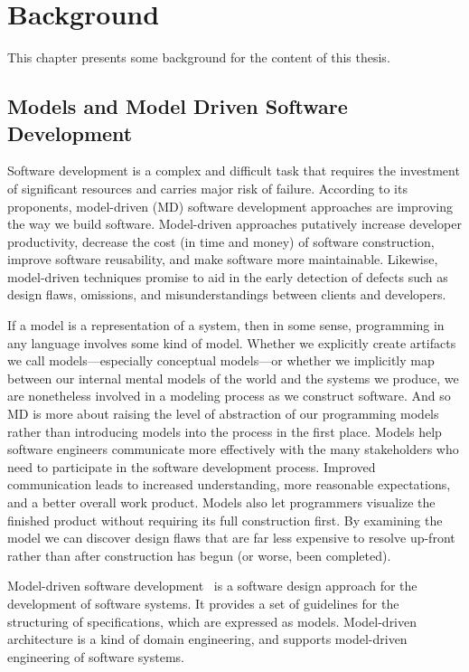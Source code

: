 
\chapter{Background} %

\label{chapter2_bg}
This chapter presents some background for the content of this thesis.

\section{Models and Model Driven Software Development}
\label{mdsd}
Software development is a complex and difficult task that requires the investment of significant resources and carries major risk of failure. According to its proponents, model-driven (MD) software development approaches are improving the way we build software. Model-driven approaches putatively increase developer productivity, decrease the cost (in time and money) of software construction, improve software reusability, and make software more maintainable. Likewise, model-driven techniques promise to aid in the early detection of defects such as design flaws, omissions, and misunderstandings between clients and developers. \par
	If a model is a representation of a system, then in some sense, programming in any language involves some kind of model. Whether we explicitly create artifacts we call models—especially conceptual models—or whether we implicitly map between our internal mental models of the world and the systems we produce, we are nonetheless involved in a modeling process as we construct software. And so MD is more about raising the level of abstraction of our programming models rather than introducing models into the process in the first place. Models  help software engineers communicate more effectively with the many stakeholders who need to participate in the software development process. Improved communication leads to increased understanding, more reasonable expectations, and a better overall work product. Models also let programmers visualize the finished product without requiring its full construction first. By examining the model we can discover design flaws that are far less expensive to resolve up-front rather than after construction has begun (or worse, been completed).\par
	Model-driven software development~\cite{liddle2011model} is a software design approach for the development of software systems. It provides a set of guidelines for the structuring of specifications, which are expressed as models. Model-driven architecture is a kind of domain engineering, and supports model-driven engineering of software systems.\par
